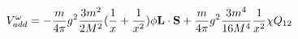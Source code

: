 \begin{equation}
V_{add}^{\omega} = -\frac{m}{4 \pi} g^{2} \frac{3 m^{2}}{2 M^{2}}
(\frac{1}{x}+ \frac{1}{x^{2}}) \phi {\bf L} \cdot {\bf S} +
\frac{m}{4 \pi} g^{2} \frac{3 m^{4}}{16 M^{4}} \frac{1}{x^{2}} \chi Q_{12} 
\end{equation}

